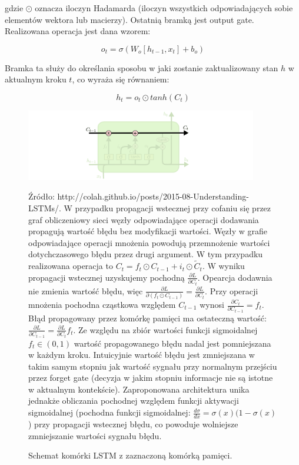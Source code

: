 \documentclass[oneside, mag]{mgr}
\begin{document}
gdzie $\odot$ oznacza iloczyn Hadamarda (iloczyn wszystkich odpowiadających sobie elementów wektora lub macierzy). Ostatnią bramką jest output gate. Realizowana operacja jest dana wzorem:

\begin{equation}
	o_t = \sigma( W_o [ h_{t-1}, x_t ] + b_o )
\end{equation}

Bramka ta służy do określania sposobu w jaki zostanie zaktualizowany stan $h$ w aktualnym kroku $t$, co wyraża się równaniem:

\begin{equation}
	h_t = o_t \odot tanh( C_t )
\end{equation}

\begin{figure}
\centering
	\includegraphics[width=0.90\textwidth]{img/LSTM3-C-line.png}
	\caption{Schemat komórki LSTM z zaznaczoną komórką pamięci.} Źródło: http://colah.github.io/posts/2015-08-Understanding-LSTMs/. W przypadku propagacji wstecznej przy cofaniu się przez graf obliczeniowy sieci węzły odpowiadające operacji dodawania propagują wartość błędu bez modyfikacji wartości. Węzły w grafie odpowiadające operacji mnożenia powodują przemnożenie wartości dotychczasowego błędu przez drugi argument. W tym przypadku realizowana operacja to $C_t = f_t \odot C_{t-1} + i_t \odot \tilde{C}_t$. W wyniku propagacji wstecznej uzyskujemy pochodną $\frac{\partial L}{\partial C_t}$. Opearcja dodawnia nie zmienia wartość błędu, więc $\frac{\partial L}{\partial (f_t \odot C_{t-1})} = \frac{\partial L}{\partial C_t}$. Przy operacji mnożenia pochodna cząstkowa względem $C_{t-1}$ wynosi $\frac{\partial C_t}{\partial C_{t-1}} = f_t$. Błąd propagowany przez komórkę pamięci ma ostateczną wartość: $\frac{\partial L}{\partial C_{t-1}} = \frac{\partial L}{\partial C_t} f_t$. Ze względu na zbiór wartości funkcji sigmoidalnej $f_t \in (0, 1)$ wartość propagowanego błędu nadal jest pomniejszana w każdym kroku. Intuicyjnie wartość błędu jest zmniejszana w takim samym stopniu jak wartość sygnału przy normalnym przejściu przez forget gate (decyzja w jakim stopniu informacje nie są istotne w aktualnym kontekście). Zaproponowana architektura unika jednakże obliczania pochodnej względem funkcji aktywacji sigmoidalnej (pochodna funkcji sigmoidalnej: $\frac{d \sigma}{dx} = \sigma (x)(1 - \sigma (x)$) przy propagacji wstecznej błędu, co powoduje wolniejsze zmniejszanie wartości sygnału błędu. 
	\label{fig:lstm-mem-cell}
\end{figure}
\end{document}
